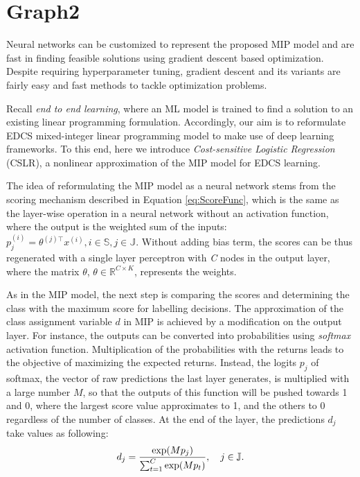\documentclass[a4paper,onesided,12pt]{report}
\newcommand{\R}{\mathbb{R}}
\begin{document}
\section{Graph2}
\label{sec:grapg2}

Neural networks can be customized to represent the proposed MIP model and are fast in finding feasible solutions using gradient descent based optimization. Despite requiring hyperparameter tuning, gradient descent and its variants are fairly easy and fast methods to tackle optimization problems.

Recall \emph{end to end learning}, where an ML model is trained to find a solution to an existing linear programming formulation. Accordingly, our aim is to reformulate EDCS mixed-integer linear programming model to make use of deep learning frameworks. To this end, here we introduce \emph{Cost-sensitive Logistic Regression} (CSLR), a nonlinear approximation of the MIP model for EDCS learning.

The idea of reformulating the MIP model as a neural network stems from the scoring mechanism described in Equation \ref{eq:ScoreFunc}, which is the same as the layer-wise operation in a neural network without an activation function, where the output is the weighted sum of the inputs: $p^{(i)}_{j} {= \theta^{(j)\top} x^{(i)}}, i \in \mathbb{S}, j \in \mathbb{J}$. Without adding bias term, the scores can be thus regenerated with a single layer perceptron with \emph{C} nodes in the output layer,  where the matrix $\theta$, $\theta \in \R^{C \times K}$, represents the weights. 

\indent As in the MIP model, the next step is comparing the scores and determining the class with the maximum score for labelling decisions. The approximation of the class assignment variable $d$ in MIP is achieved by a modification on the output layer. For instance, the outputs can be converted into probabilities using \emph{softmax} activation function. Multiplication of the probabilities with the returns leads to the objective of maximizing the expected returns. Instead, the logits $p_{j}$ of softmax, the vector of raw predictions the last layer generates, is multiplied with a large number $M$, so that the outputs of this function will be pushed towards 1 and 0, where the largest score value approximates to 1, and the others to 0 regardless of the number of classes. At the end of the layer, the predictions $d_{j}$ take values as following:
\begin{equation}
{\label{eq:Softmax}}
  d_{j} = \frac{\exp(M p_{j} )}{ \sum_{t=1}^{C}{\exp(M p_{t})}}, \quad  j \in \mathbb{J}.
\end{equation}
\end{document}
